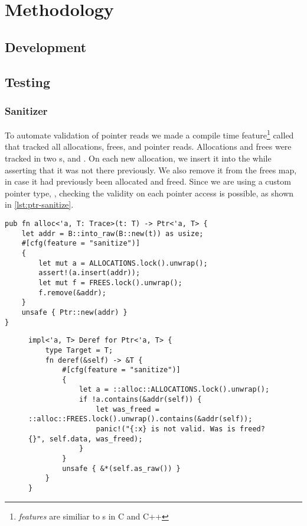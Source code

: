 \chapter{Methodology}
\lorem{}

\section{Development}
\lorem{}

\section{Testing}
\lorem{}

\subsection{Sanitizer}

To automate validation of pointer reads we made a compile time feature\footnote{\emph{features} are
similiar to s in C and C++} called  that tracked all allocations,
frees, and pointer reads.  Allocations and frees were tracked in two s,
 and .  On each new allocation, we insert it into the 
while asserting that it was not there previously. We also remove it from the frees map, in case it
had previously been allocated and freed. Since we are using a custom pointer type, ,
checking the validity on each pointer access is possible, as shown in \cref{lst:ptr-sanitize}.

\begin{lstlisting}
pub fn alloc<'a, T: Trace>(t: T) -> Ptr<'a, T> {
    let addr = B::into_raw(B::new(t)) as usize;
    #[cfg(feature = "sanitize")]
    {
        let mut a = ALLOCATIONS.lock().unwrap();
        assert!(a.insert(addr));
        let mut f = FREES.lock().unwrap();
        f.remove(&addr);
    }
    unsafe { Ptr::new(addr) }
}
\end{lstlisting}

\begin{figure}[ht]
\begin{lstlisting}[label=lst:ptr-sanitize,caption=Verifying all pointer accesses with
\code{sanitize}]
impl<'a, T> Deref for Ptr<'a, T> {
    type Target = T;
    fn deref(&self) -> &T {
        #[cfg(feature = "sanitize")]
        {
            let a = ::alloc::ALLOCATIONS.lock().unwrap();
            if !a.contains(&addr(self)) {
                let was_freed = ::alloc::FREES.lock().unwrap().contains(&addr(self));
                panic!("{:x} is not valid. Was is freed? {}", self.data, was_freed);
            }
        }
        unsafe { &*(self.as_raw()) }
    }
}
\end{lstlisting}
\end{figure}

